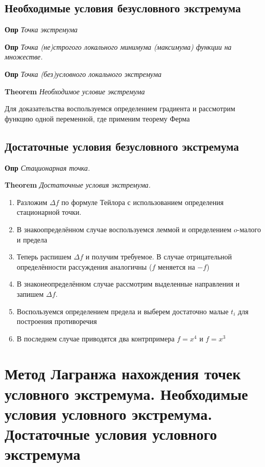 \documentclass[a4paper, 14pt]{article}
\begin{document}
    \subsection{Необходимые условия безусловного экстремума}
    
    \textbf{Опр} \textit{Точка экстремума}
    
    \textbf{Опр} \textit{Точка (не)строгого локального минимума (максимума) функции на множестве.}
    
    \textbf{Опр} \textit{Точка (без)условного локального экстремума}
    
    \textbf{Theorem} \textit{Необходимое условие экстремума}
    
    Для доказательства воспользуемся определением градиента и рассмотрим функцию одной переменной, где применим теорему
    Ферма
    
    \subsection{Достаточные условия безусловного экстремума}
    
    \textbf{Опр} \textit{Стационарная точка.}
    
    \textbf{Theorem} \textit{Достаточные условия экстремума.}
    
    \begin{enumerate}
        \item Разложим $\Delta f$ по формуле Тейлора с использованием определения стационарной точки.
        \item В знакоопределённом случае воспользуемся леммой и определением $o$-малого и предела
        \item Теперь распишем $\Delta f$ и получим требуемое.
        В случае отрицательной определённости рассуждения аналогичны ($f$ меняется на $-f$)
        \item В знаконеопределённом случае рассмотрим выделенные направления и запишем $\Delta f$.
        \item Воспользуемся определением предела и выберем достаточно малые $t_i$ для построения противоречия
        \item В последнем случае приводятся два контрпримера $f = x^4$ и $f = x^3$
    \end{enumerate}
    
    \section{Метод Лагранжа нахождения точек условного экстремума.
    Необходимые условия условного экстремума.
    Достаточные условия условного экстремума}
    
\end{document}
